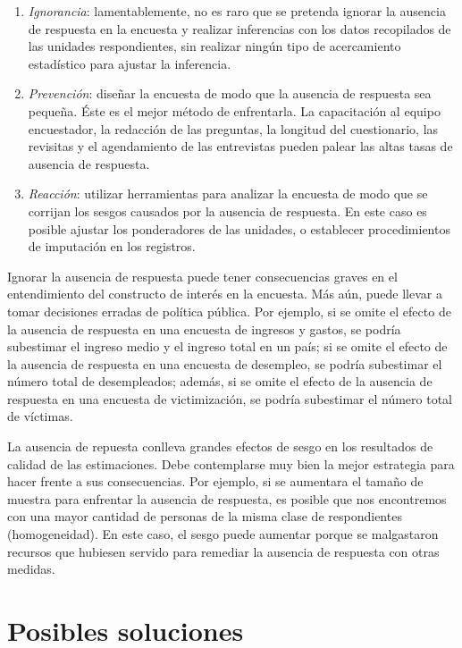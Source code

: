\documentclass[
  12pt,
]{book}
\providecommand{\tightlist}{%
  \setlength{\itemsep}{0pt}\setlength{\parskip}{0pt}}
\begin{document}
\begin{enumerate}
\def\labelenumi{\arabic{enumi}.}
\tightlist
\item
  \emph{Ignorancia}: lamentablemente, no es raro que se pretenda ignorar la ausencia de respuesta en la encuesta y realizar inferencias con los datos recopilados de las unidades respondientes, sin realizar ningún tipo de acercamiento estadístico para ajustar la inferencia.
\item
  \emph{Prevención}: diseñar la encuesta de modo que la ausencia de respuesta sea pequeña. Éste es el mejor método de enfrentarla. La capacitación al equipo encuestador, la redacción de las preguntas, la longitud del cuestionario, las revisitas y el agendamiento de las entrevistas pueden palear las altas tasas de ausencia de respuesta.
\item
  \emph{Reacción}: utilizar herramientas para analizar la encuesta de modo que se corrijan los sesgos causados por la ausencia de respuesta. En este caso es posible ajustar los ponderadores de las unidades, o establecer procedimientos de imputación en los registros.
\end{enumerate}

Ignorar la ausencia de respuesta puede tener consecuencias graves en el entendimiento del constructo de interés en la encuesta. Más aún, puede llevar a tomar decisiones erradas de política pública. Por ejemplo, si se omite el efecto de la ausencia de respuesta en una encuesta de ingresos y gastos, se podría subestimar el ingreso medio y el ingreso total en un país; si se omite el efecto de la ausencia de respuesta en una encuesta de desempleo, se podría subestimar el número total de desempleados; además, si se omite el efecto de la ausencia de respuesta en una encuesta de victimización, se podría subestimar el número total de víctimas.

La ausencia de repuesta conlleva grandes efectos de sesgo en los resultados de calidad de las estimaciones. Debe contemplarse muy bien la mejor estrategia para hacer frente a sus consecuencias. Por ejemplo, si se aumentara el tamaño de muestra para enfrentar la ausencia de respuesta, es posible que nos encontremos con una mayor cantidad de personas de la misma clase de respondientes (homogeneidad). En este caso, el sesgo puede aumentar porque se malgastaron recursos que hubiesen servido para remediar la ausencia de respuesta con otras medidas.

\hypertarget{posibles-soluciones}{%
\section{Posibles soluciones}\label{posibles-soluciones}}
\end{document}
